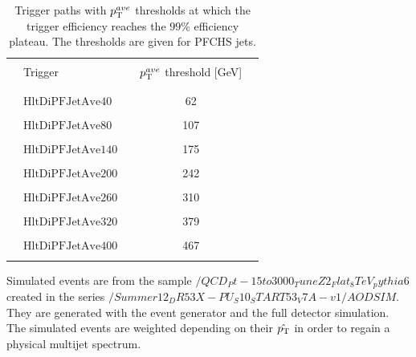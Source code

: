 \begin{table}[!tp]
\centering
\caption{Trigger paths with $p_{\text{T}}^{ave}$ thresholds at which the trigger efficiency reaches the $99\%$ efficiency plateau. The thresholds are given for PFCHS jets.}
\label{tab:trigger}
\begin{tabular}{clccc}
 & & & & \\
 & Trigger & & $p_{\text{T}}^{ave}$ threshold [GeV] & \\
 & & & & \\
\hline
 & & & & \\
 & $\mathrm{HltDiPFJetAve40}$ & & 62 & \\
 & & & & \\
 & $\mathrm{HltDiPFJetAve80}$ & & 107 & \\
 & & & & \\
 & $\mathrm{HltDiPFJetAve140}$ & & 175 & \\
 & & & & \\
 & $\mathrm{HltDiPFJetAve200}$ & & 242 & \\
 & & & & \\
 & $\mathrm{HltDiPFJetAve260}$ & & 310 & \\
 & & & & \\
 & $\mathrm{HltDiPFJetAve320}$ & & 379 & \\
 & & & & \\
 & $\mathrm{HltDiPFJetAve400}$ & & 467 & \\
 & & & & \\
\hline
\end{tabular}%
\end{table} 
Simulated events are from the sample $/QCD_Pt-15to3000_TuneZ2_Flat_8TeV_pythia6$ created in the series $/Summer12_DR53X-PU_S10_START53_V7A-v1/AODSIM$. They are generated with the \pythia event generator and the full detector simulation. The simulated events are weighted depending on their $\hat{p_{\text{T}}}$ in order to regain a physical multijet spectrum.  

